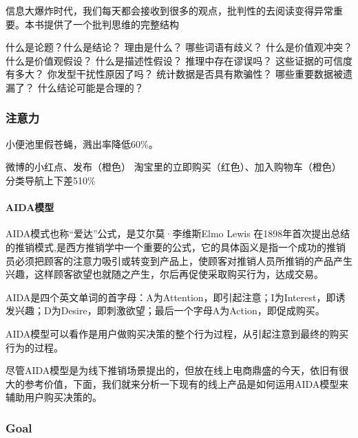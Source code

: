 \documentclass[letterpaper,11pt,english]{sphinxmanual}
\begin{document}
信息大爆炸时代，我们每天都会接收到很多的观点，批判性的去阅读变得异常重要。本书提供了一个批判思维的完整结构

什么是论题？什么是结论？ 理由是什么？ 哪些词语有歧义？
什么是价值观冲突？什么是价值观假设？ 什么是描述性假设？
推理中存在谬误吗？ 这些证据的可信度有多大？ 你发型干扰性原因了吗？
统计数据是否具有欺骗性？ 哪些重要数据被遗漏了？ 什么结论可能是合理的？


\subsubsection{注意力}
\label{\detokenize{chapter_idea/attention:id1}}\label{\detokenize{chapter_idea/attention::doc}}
小便池里假苍蝇，溅出率降低60\%。

微博的小红点、发布（橙色） 淘宝里的立即购买（红色）、加入购物车（橙色）
分类导航上下差5\sphinxhyphen{}10\%


\paragraph{AIDA模型}
\label{\detokenize{chapter_idea/attention:aida}}
AIDA模式也称“爱达”公式，是艾尔莫·李维斯Elmo Lewis
在1898年首次提出总结的推销模式,是西方推销学中一个重要的公式，它的具体函义是指一个成功的推销员必须把顾客的注意力吸引或转变到产品上，使顾客对推销人员所推销的产品产生兴趣，这样顾客欲望也就随之产生，尔后再促使采取购买行为，达成交易。

AIDA是四个英文单词的首字母：A为Attention，即引起注意；I为Interest，即诱发兴趣；D为Desire，即刺激欲望；最后一个字母A为Action，即促成购买。

AIDA模型可以看作是用户做购买决策的整个行为过程，从引起注意到最终的购买行为的过程。

尽管AIDA模型是为线下推销场景提出的，但放在线上电商鼎盛的今天，依旧有很大的参考价值，下面，我们就来分析一下现有的线上产品是如何运用AIDA模型来辅助用户购买决策的。


\subsubsection{Goal}
\label{\detokenize{chapter_idea/goal:goal}}\label{\detokenize{chapter_idea/goal::doc}}
\end{document}
